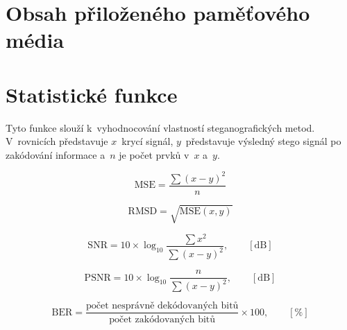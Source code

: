 \chapter{Obsah přiloženého paměťového média}
\label{cha:medium-contents}

\chapter{Statistické funkce}
\label{cha:statistical-functions}

Tyto funkce slouží k~vyhodnocování vlastností steganografických metod.
V~rovnicích představuje $x$~krycí signál, $y$~představuje výsledný stego
signál po zakódování informace a~$n$ je počet prvků v~$x$ a~$y$.

\begin{equation}
    \textrm{MSE} = \frac{\sum{(x-y)^2}}{n}
\end{equation}

\begin{equation}
    \textrm{RMSD} = \sqrt{\textrm{MSE}(x, y)}
\end{equation}

\begin{equation}
    \textrm{SNR} = 10 \times \log_{10}{\frac{\sum{x^2}}{\sum{(x-y)^2}}}, \qquad [\textrm{dB}]
\end{equation}

\begin{equation}
    \textrm{PSNR} = 10 \times \log_{10}{\frac{n}{\sum{(x-y)^2}}}, \qquad [\textrm{dB}]
\end{equation}

\begin{equation}
    \textrm{BER} = \frac{\textrm{počet nesprávně dekódovaných bitů}}{\textrm{počet zakódovaných bitů}} \times 100, \qquad [\%]
\end{equation}
